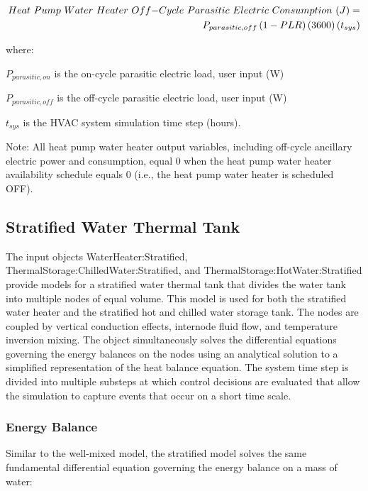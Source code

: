 \begin{equation}
\begin{split}
Heat~Pump~Water~Heater~Off{\rm{ - }}Cycle~Parasitic~Electric~Consumption~(J) = \\{P_{parasitic,off}}\left( {1 - PLR} \right)\left( {3600} \right)\left( {{t_{sys}}} \right)
\end{split}
\end{equation}

where:

\({P_{parasitic,on}}\) is the on-cycle parasitic electric load, user input (W)

\({P_{parasitic,off}}\) is the off-cycle parasitic electric load, user input (W)

\({t_{sys}}\) is the HVAC system simulation time step (hours).

Note: All heat pump water heater output variables, including off-cycle ancillary electric power and consumption, equal 0 when the heat pump water heater availability schedule equals 0 (i.e., the heat pump water heater is scheduled OFF).

\subsection{Stratified Water Thermal Tank}\label{stratified-water-thermal-tank}

The input objects WaterHeater:Stratified,
ThermalStorage:ChilledWater:Stratified, and ThermalStorage:HotWater:Stratified
provide models for a stratified water thermal tank that divides the water tank
into multiple nodes of equal volume. This model is used for both the stratified
water heater and the stratified hot and chilled water storage tank. The nodes are
coupled by vertical conduction effects, internode fluid flow, and temperature
inversion mixing. The object simultaneously solves the differential equations
governing the energy balances on the nodes using an analytical solution to a
simplified representation of the heat balance equation. The system time step is
divided into multiple substeps at which control decisions are evaluated that
allow the simulation to capture events that occur on a short time scale.

\subsubsection{Energy Balance}\label{energy-balance-1}

Similar to the well-mixed model, the stratified model solves the same fundamental differential equation governing the energy balance on a mass of water:

